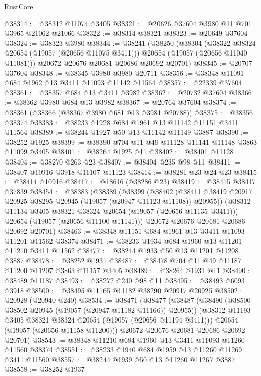 \begin{lexlean}{RustCore}
\begin{coremodule}
@38314 := @38312 @11074 @3405
@38321 := @20626 @37604 @3980 @11 @701 @3965 @21062 @21066
@38322 := @38314 @38321
@38323 := @20649 @37604
@38324 := @38323 @3980
@38344 := @38241
    (@38250
      (@38304
        (@38322 @38324 @20654 (@19057 (@20656 @11075 @3411)))
        @20654
        (@19057 (@20656 @11040 @11081)))
      @20672
      @20676
      @20681
      @20686
      @20692
      @20701)
@38345 := @20707 @37604
@38348 := @38345 @3980 @3980 @20711
@38356 := @38348 @11091 @684 @1962 @13 @3411 @11093 @11142 @11564
@38357 := @22339 @37604
@38361 := @38357 @684 @13 @3411 @3982
@38362 := @20732 @37604
@38366 := @38362 @3980 @684 @13 @3982
@38367 := @20764 @37604
@38374 := @38361 (@38366 (@38367 @3980 @681 @13 @3981 @20788))
@38375 := @38356 @38374
@38383 := @38233 @1928 @684 @1961 @13 @11142 @11151 @3411 @11564
@38389 := @38244 @1927 @50 @13 @11142 @11149 @3887
@38390 := @38252 @1925
@38399 := @38390 @704 @11 @49 @11128 @11141 @11148 @3863 @11099 @3405
@38401 := @38264 @1925 @11
@38402 := @38401 @11128
@38404 := @38270 @263 @23
@38407 := @38404 @235 @98 @11
@38411 := @38407 @10916 @3918 @11107 @11123
@38414 := @38281 @23 @24 @23
@38415 := @38414 @10916
@38417 := @18616 (@38286 @23)
@38419 := @38415 @38417 @37839
@38454 := @38383
    (@38389
      (@38399
        (@38402 (@38411 @38419 @20917 @20925 @38295 @20945 (@19057 (@20947 @11123 @11108)) @20955))
        (@38312 @11134 @3405 @38321 @38324 @20654 (@19057 (@20656 @11135 @3411)))
        @20654
        (@19057 (@20656 @11100 @11141)))
      @20672
      @20676
      @20681
      @20686
      @20692
      @20701)
@38463 := @38348 @11151 @684 @1961 @13 @3411 @11093 @11201 @11562 @38374
@38471 := @38233 @1934 @684 @1960 @13 @11201 @11210 @3411 @11562
@38477 := @38244 @1933 @50 @13 @11201 @11208 @3887
@38478 := @38252 @1931
@38487 := @38478 @704 @11 @49 @11187 @11200 @11207 @3863 @11157 @3405
@38489 := @38264 @1931 @11
@38490 := @38489 @11187
@38493 := @38272 @240 @98 @11
@38495 := @38493 @6093 @3918
@38500 := @38495 @11165 @11182 @38290 @20917 @20925
@38502 := @20928 (@20940 @240)
@38534 := @38471
    (@38477
      (@38487
        (@38490 (@38500 @38502 @20945 (@19057 (@20947 @11182 @11166)) @20955))
        (@38312 @11193 @3405 @38321 @38324 @20654 (@19057 (@20656 @11194 @3411)))
        @20654
        (@19057 (@20656 @11158 @11200)))
      @20672
      @20676
      @20681
      @20686
      @20692
      @20701)
@38543 := @38348 @11210 @684 @1960 @13 @3411 @11093 @11260 @11560 @38374
@38551 := @38233 @1940 @684 @1959 @13 @11260 @11269 @3411 @11560
@38557 := @38244 @1939 @50 @13 @11260 @11267 @3887
@38558 := @38252 @1937

\end{coremodule}
\end{lexlean}
